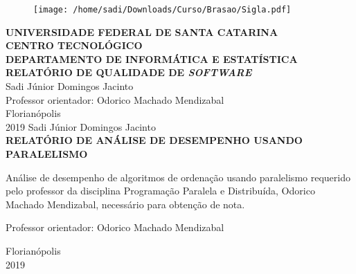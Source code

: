 \documentclass[12pt,a4paper,brazil,abntex2]{article}
\begin{document}
\singlespacing
\begin{titlepage}
\begin{center}
\begin{figure}[!htb]
\center

\texttt{[image: /home/sadi/Downloads/Curso/Brasao/Sigla.pdf]} 

\end{figure}
{\bf  UNIVERSIDADE FEDERAL DE SANTA CATARINA}\\[0.2cm]
{\bf CENTRO TECNOLÓGICO}\\[0.2cm]
{\bf  DEPARTAMENTO DE INFORMÁTICA E ESTATÍSTICA}\\[5.5cm]
{\bf \large RELATÓRIO DE QUALIDADE DE \textit{SOFTWARE}}\\[3.6 cm]
{Sadi Júnior Domingos Jacinto}\\[1cm]
{Professor orientador: Odorico Machado Mendizabal}\\[4.1 cm]
{Florianópolis}\\[0.2cm]
{2019}
\newpage
\thispagestyle{empty}
{Sadi Júnior Domingos Jacinto}\\[9cm]
{\bf \large RELATÓRIO DE ANÁLISE DE DESEMPENHO USANDO PARALELISMO}\\[0.5cm]
    \begin{flushright}
    \begin{list}{}{
      \setlength{\leftmargin}{7.2cm}
      \setlength{\rightmargin}{0cm}
      \setlength{\labelwidth}{0pt}
      \setlength{\labelsep}{\leftmargin}}
      \item Análise de desempenho de algoritmos de ordenação usando paralelismo requerido pelo professor da disciplina Programação Paralela e Distribuída, Odorico Machado Mendizabal, necessário para obtenção de nota.\\[0.2 cm] 
      \setlength{\labelsep}{\leftmargin}
      \item Professor orientador: Odorico Machado Mendizabal\
      \\[8.2cm]
     \end{list}
	 \end{flushright}
{Florianópolis}\\[0.2cm]
{2019}
\end{center}
\end{titlepage} %

\newpage
\end{document}
